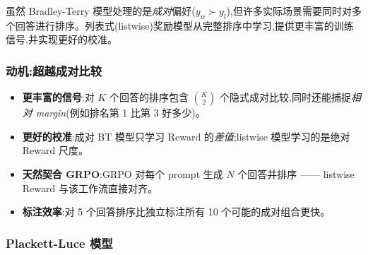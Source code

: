 虽然 Bradley-Terry 模型处理的是\emph{成对}偏好($y_w \succ y_l$),但许多实际场景需要同时对多个回答进行排序。列表式(listwise)奖励模型从完整排序中学习,提供更丰富的训练信号,并实现更好的校准。

\subsubsection*{动机:超越成对比较}
\label{motivation-beyond-pairwise}

\begin{intuitionbox}
\begin{itemize}
  \item \textbf{更丰富的信号}:对 $K$ 个回答的排序包含 $\binom{K}{2}$ 个隐式成对比较,同时还能捕捉\emph{相对 margin}(例如排名第 1 比第 3 好多少)。
  \item \textbf{更好的校准}:成对 BT 模型只学习 Reward 的\emph{差值};listwise 模型学习的是绝对 Reward 尺度。
  \item \textbf{天然契合 GRPO}:GRPO 对每个 prompt 生成 $N$ 个回答并排序 —— listwise Reward 与该工作流直接对齐。
  \item \textbf{标注效率}:对 5 个回答排序比独立标注所有 10 个可能的成对组合更快。
\end{itemize}
\end{intuitionbox}

\subsubsection*{Plackett-Luce 模型}
\label{plackett-luce-model}

